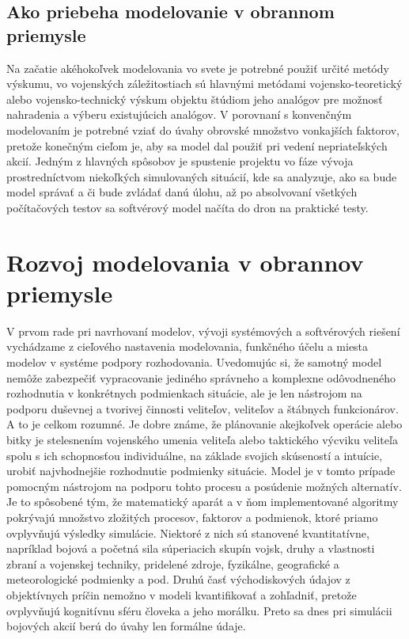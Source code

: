\documentclass{article}
\begin{document}
\subsection{Ako priebeha modelovanie v obrannom priemysle}

\cite{Klaus}Na začatie akéhokoľvek modelovania vo svete je potrebné použiť určité metódy výskumu, vo vojenských záležitostiach sú hlavnými metódami vojensko-teoretický alebo vojensko-technický výskum objektu štúdiom jeho analógov pre možnosť nahradenia a výberu existujúcich analógov. V porovnaní s konvenčným modelovaním je potrebné vziať do úvahy obrovské množstvo vonkajších faktorov, pretože konečným cieľom je, aby sa model dal použiť pri vedení nepriateľských akcií. Jedným z hlavných spôsobov je spustenie projektu vo fáze vývoja prostredníctvom niekoľkých simulovaných situácií, kde sa analyzuje, ako sa bude model správať a či bude zvládať danú úlohu, až po absolvovaní všetkých počítačových testov sa softvérový model načíta do dron na praktické testy.

\newpage

\section{Rozvoj modelovania v obrannov priemysle}

V prvom rade pri navrhovaní modelov, vývoji systémových a softvérových riešení vychádzame z cieľového nastavenia modelovania, funkčného účelu a miesta modelov v systéme podpory rozhodovania. Uvedomujúc si, že samotný model nemôže zabezpečiť vypracovanie jediného správneho a komplexne odôvodneného rozhodnutia v konkrétnych podmienkach situácie, ale je len nástrojom na podporu duševnej a tvorivej činnosti veliteľov, veliteľov a štábnych funkcionárov. A to je celkom rozumné. Je dobre známe, že plánovanie akejkoľvek operácie alebo bitky je stelesnením vojenského umenia veliteľa alebo taktického výcviku veliteľa spolu s ich schopnosťou individuálne, na základe svojich skúseností a intuície, urobiť najvhodnejšie rozhodnutie podmienky situácie. \cite{8612752}Model je v tomto prípade pomocným nástrojom na podporu tohto procesu a posúdenie možných alternatív. Je to spôsobené tým, že matematický aparát a v ňom implementované algoritmy pokrývajú množstvo zložitých procesov, faktorov a podmienok, ktoré priamo ovplyvňujú výsledky simulácie. Niektoré z nich sú stanovené kvantitatívne, napríklad bojová a početná sila súperiacich skupín
vojsk, druhy a vlastnosti zbraní a vojenskej techniky, pridelené zdroje, fyzikálne, geografické a meteorologické podmienky a pod. Druhú časť východiskových údajov z objektívnych príčin nemožno v modeli kvantifikovať a zohľadniť, pretože ovplyvňujú kognitívnu sféru človeka a jeho morálku. Preto sa dnes pri simulácii bojových akcií berú do úvahy len formálne údaje.
\end{document}
